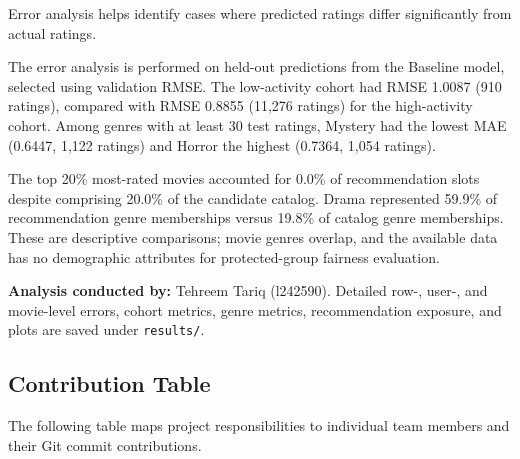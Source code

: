 \documentclass[11pt,a4paper]{article}
\begin{document}
Error analysis helps identify cases where predicted ratings
differ significantly from actual ratings.

The error analysis is performed on held-out predictions from the
Baseline model, selected using validation RMSE. The low-activity
cohort had RMSE 1.0087 (910 ratings), compared with RMSE 0.8855
(11,276 ratings) for the high-activity cohort. Among genres with
at least 30 test ratings, Mystery had the lowest MAE (0.6447,
1,122 ratings) and Horror the highest (0.7364, 1,054 ratings).

The top 20\% most-rated movies accounted for 0.0\% of recommendation
slots despite comprising 20.0\% of the candidate catalog. Drama
represented 59.9\% of recommendation genre memberships versus
19.8\% of catalog genre memberships. These are descriptive
comparisons; movie genres overlap, and the available data has no
demographic attributes for protected-group fairness evaluation.

\textbf{Analysis conducted by:} Tehreem Tariq (l242590). Detailed row-, user-, and movie-level errors, cohort metrics,
genre metrics, recommendation exposure, and plots are saved under
\texttt{results/}.

\subsection{Contribution Table}

The following table maps project responsibilities to individual team members and their Git commit contributions.
\end{document}
